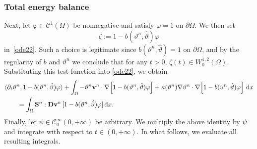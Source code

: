 \documentclass[11pt, a4paper, reqno]{amsart}
\newcommand{\dual}[2]{\langle #1,#2\rangle}
\numberwithin{equation}{section}
\newcommand{\thetah}{\hat\thet}
\newcommand{\vc}[1]{{\bf #1}}
\newcommand{\vv}{\vc{v}}
\newcommand{\thet}{\vartheta}
\renewcommand{\S}{\mathbf{S}}
\newcommand{\D}{\mathbf{D}}
\newcommand{\dx}{\,{\rm d} {x}}
\newcommand{\intO}[1]{\int_{\Omega} #1 \dx}
\newcommand{\bb}{b}
\begin{document}
\subsubsection{Total energy balance}\label{sec:TE}
Next, let $\varphi \in \mathcal{C}^1(\Omega)$ be nonnegative and satisfy $\varphi = 1$ on $\partial \Omega$. We then set 
$$
  \zeta := 1 - \bb(\thet^n, \thetah)\varphi
$$
in~\eqref{ode22}. Such a choice is legitimate since $\bb(\thet^n,\thetah)=1$ on $\partial \Omega$, and by the regularity of $\bb$ and $\thet^n$ we conclude that for any $t>0$, $\zeta(t) \in W^{1,2}_0(\Omega)$. Substituting this test function into \eqref{ode22}, we obtain
\begin{equation}\label{rur}
\begin{aligned}
&\dual{\partial_t\thet^{n}}{1-\bb(\thet^n, \thetah)\varphi} 
+ \int_{\Omega} -\thet^{n} \vv^{n} \cdot \nabla\!\left[1-\bb(\thet^n, \thetah)\varphi\right] 
+ \kappa(\thet^n)\nabla\thet^{n}\cdot \nabla\!\left[1-\bb(\thet^n, \thetah)\varphi\right] \dx \\
&\qquad = \intO{\S^{n}:\D\vv^{n} \, [1-\bb(\thet^n, \thetah)\varphi]}.
\end{aligned}
\end{equation}
Finally, let $\psi \in \mathcal{C}^\infty_0(0,+\infty)$ be arbitrary. We multiply the above identity by $\psi$ and integrate with respect to $t \in (0,+\infty)$. In what follows, we evaluate all resulting integrals. 
\end{document}
